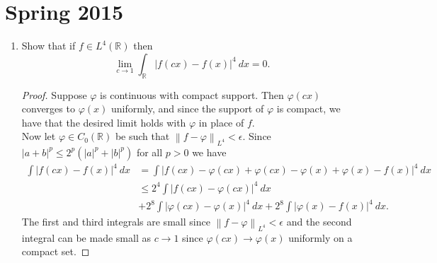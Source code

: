 \documentclass[11pt,letterpaper]{report}
\newcommand{\reals}{\mathbb{R}}
\newcommand{\Lp}[2]{\left\|{#1}\right\|_{L^{#2}}}
\begin{document}
\section*{Spring 2015}
\begin{enumerate}
	\item Show that if $f\in L^4(\reals)$ then
	\[
	\lim_{c\to 1}\int_\reals|f(cx)-f(x)|^4\ dx = 0.
	\]
	\begin{proof}
		Suppose $\varphi$ is continuous with compact support. Then $\varphi(cx)$ converges to $\varphi(x)$ uniformly, and since the support of $\varphi$ is compact, we have that the desired limit holds with $\varphi$ in place of $f$.\\

		\noindent Now let $\varphi\in C_0(\reals)$ be such that $\Lp{f-\varphi}{4}<\epsilon$. Since $|a+b|^p \leq 2^p(|a|^p+|b|^p)$ for all $p>0$ we have
		\begin{align*}
			\int|f(cx)-f(x)|^4\ dx &= \int|f(cx)-\varphi(cx)+\varphi(cx)-\varphi(x)+\varphi(x)-f(x)|^4\ dx\\
			&\leq 2^4\int|f(cx)-\varphi(cx)|^4\ dx\\
			&+ 2^8\int|\varphi(cx)-\varphi(x)|^4\ dx + 2^8\int|\varphi(x)-f(x)|^4\ dx.
		\end{align*}
		The first and third integrals are small since $\Lp{f-\varphi}{4}<\epsilon$ and the second integral can be made small as $c\to 1$ since $\varphi(cx)\to \varphi(x)$ uniformly on a compact set.
	\end{proof}


\end{enumerate}
\end{document}
